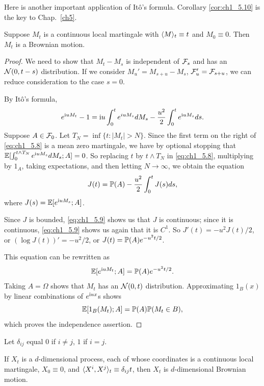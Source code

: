 Here is another important application of It\^o's formula. Corollary \ref{cor:ch1_5.10} is the key to Chap.\ \ref{ch5}.

\begin{theorem}\label{thm:ch1_5.9}
Suppose $M_t$ is a continuous local martingale with $\lrang{M}_t \equiv t$ and $M_0 \equiv 0$. Then $M_t$ is a Brownian motion.
\end{theorem}

\begin{proof}
We need to show that $M_t - M_s$ is independent of $\FC_s$ and has an $\NC(0,t-s)$ distribution. If we consider $M_u' = M_{s+u} - M_s$, $\FC_u' = \FC_{s+u}$, we can reduce consideration to the case $s = 0$.

By It\^o's formula,
\begin{equation}\label{eq:ch1_5.8}
    e^{\im uM_t} - 1 = \im u\int_0^t e^{iuM_s}dM_s - \frac{u^2}{2}\int_0^t e^{\im uM_s}ds.
\end{equation}
Suppose $A \in \FC_0$. Let $T_N = \inf\{t : |M_t| > N\}$. Since the first term on the right of \eqref{eq:ch1_5.8} is a mean zero martingale, we have by optional stopping that $\E[\int_0^{t\wedge T_N} e^{\im uM_s}dM_s; A] = 0$. So replacing $t$ by $t\wedge T_N$ in \eqref{eq:ch1_5.8}, multiplying by $1_A$, taking expectations, and then letting $N \to \infty$, we obtain the equation
\begin{equation}\label{eq:ch1_5.9}
    J(t) = \P(A) - \frac{u^2}{2}\int_0^t J(s)ds,
\end{equation}
where $J(s) = \E[e^{\im uM_s}; A]$.

Since $J$ is bounded, \eqref{eq:ch1_5.9} shows us that $J$ is continuous; since it is continuous, \eqref{eq:ch1_5.9} shows us again that it is $C^1$. So $J'(t) = -u^2J(t)/2$, or $(\log J(t))'=-u^2/2$, or $J(t) = \P(A)e^{-u^2t/2}$.

This equation can be rewritten as
\[
    \E[e^{\im uM_t}; A] = \P(A)e^{-u^2t/2}.
\]
Taking $A = \Omega$ shows that $M_t$ has an $\NC(0,t)$ distribution. Approximating $1_B(x)$ by linear combinations of $e^{\im ux}$s shows
\[
    \E[1_B(M_t); A] = \P(A)\P(M_t \in B),
\]
which proves the independence assertion.
\end{proof}

Let $\delta_{ij}$ equal $0$ if $i \ne j$, $1$ if $i=j$.

\mpagebreak

\begin{corollary}\label{cor:ch1_5.10}
If $X_t$ is a $d$-dimensional process, each of whose coordinates is a continuous local martingale, $X_0 \equiv 0$, and $\lrang{X^i,X^j}_t \equiv \delta_{ij}t$, then $X_t$ is $d$-dimensional Brownian motion.
\end{corollary}


